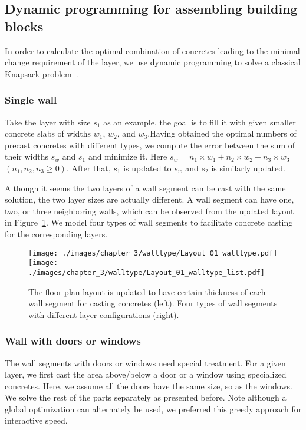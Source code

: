 \subsection{Dynamic programming for assembling building blocks}

In order to calculate the optimal combination of concretes leading to the minimal change requirement of the layer, we use dynamic programming to solve a classical Knapsack problem~\cite{gary1979computers}.

\subsubsection{Single wall}

Take the layer with size $s_1$ as an example, the goal is to fill it with given smaller concrete slabs of widths $w_1$, $w_2$, and $w_3$.Having obtained the optimal numbers of precast concretes with different types, we compute the error between the sum of their widths $s_w$ and $s_1$ and minimize it. Here $s_w = n_1 \times w_1 + n_2 \times w_2 + n_3 \times w_3$ $(n_1, n_2, n_3 \geq 0)$. After that, $s_1$ is updated to $s_w$ and $s_2$ is similarly updated.

Although it seems the two layers of a wall segment can be cast with the same solution, the two layer sizes are actually different. A wall segment can have one, two, or three neighboring walls, which can be observed from the updated layout in Figure~\ref{walltype}. We model four types of wall segments to facilitate concrete casting for the corresponding layers.

\begin{figure}[h!]
\centering
\texttt{[image: ./images/chapter\_3/walltype/Layout\_01\_walltype.pdf]}
\texttt{[image: ./images/chapter\_3/walltype/Layout\_01\_walltype\_list.pdf]}
\caption{The floor plan layout is updated to have certain thickness of each wall segment for casting concretes (left). Four types of wall segments with different layer configurations (right).}
\label{walltype}
\vspace{-.1in}
\end{figure}

\subsubsection{Wall with doors or windows}

The wall segments with doors or windows need special treatment. For a given layer, we first cast the area above/below a door or a window using specialized concretes. Here, we assume all the doors have the same size, so as the windows. We solve the rest of the parts separately as presented before. Note although a global optimization can alternately be used, we preferred this greedy approach for interactive speed.

